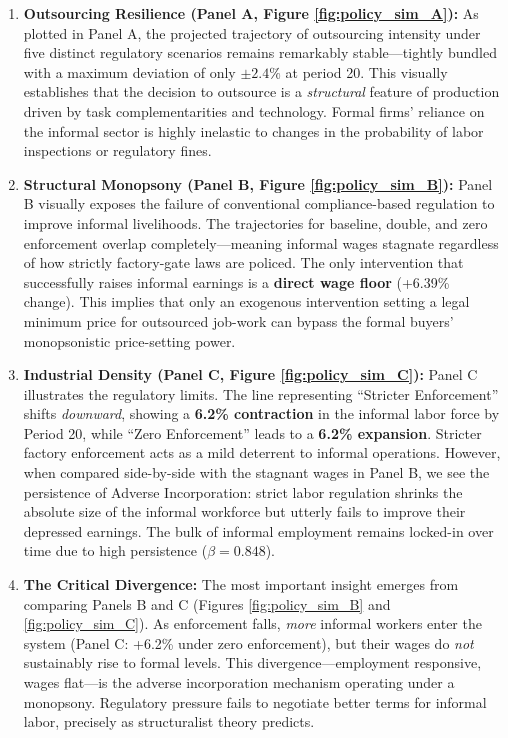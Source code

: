 \begin{enumerate}
	\item \textbf{Outsourcing Resilience (Panel A, Figure \ref{fig:policy_sim_A}):} As plotted in Panel A, the projected trajectory of outsourcing intensity under five distinct regulatory scenarios remains remarkably stable—tightly bundled with a maximum deviation of only $\pm2.4\%$ at period 20. This visually establishes that the decision to outsource is a \textit{structural} feature of production driven by task complementarities and technology. Formal firms' reliance on the informal sector is highly inelastic to changes in the probability of labor inspections or regulatory fines.
	
	\item \textbf{Structural Monopsony (Panel B, Figure \ref{fig:policy_sim_B}):} Panel B visually exposes the failure of conventional compliance-based regulation to improve informal livelihoods. The trajectories for baseline, double, and zero enforcement overlap completely—meaning informal wages stagnate regardless of how strictly factory-gate laws are policed. The only intervention that successfully raises informal earnings is a \textbf{direct wage floor} (+6.39\% change). This implies that only an exogenous intervention setting a legal minimum price for outsourced job-work can bypass the formal buyers' monopsonistic price-setting power.
	
	\item \textbf{Industrial Density (Panel C, Figure \ref{fig:policy_sim_C}):} Panel C illustrates the regulatory limits. The line representing ``Stricter Enforcement'' shifts \textit{downward}, showing a \textbf{6.2\% contraction} in the informal labor force by Period 20, while ``Zero Enforcement'' leads to a \textbf{6.2\% expansion}. Stricter factory enforcement acts as a mild deterrent to informal operations. However, when compared side-by-side with the stagnant wages in Panel B, we see the persistence of Adverse Incorporation: strict labor regulation shrinks the absolute size of the informal workforce but utterly fails to improve their depressed earnings. The bulk of informal employment remains locked-in over time due to high persistence ($\beta=0.848$).
	
	\item \textbf{The Critical Divergence:} The most important insight emerges from comparing Panels B and C (Figures \ref{fig:policy_sim_B} and \ref{fig:policy_sim_C}). As enforcement falls, \textit{more} informal workers enter the system (Panel C: +6.2\% under zero enforcement), but their wages do \textit{not} sustainably rise to formal levels. This divergence—employment responsive, wages flat—is the adverse incorporation mechanism operating under a monopsony. Regulatory pressure fails to negotiate better terms for informal labor, precisely as structuralist theory predicts.
\end{enumerate}

